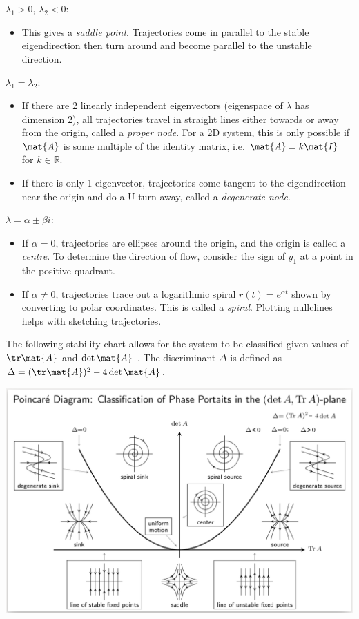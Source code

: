 \documentclass[10pt, a4paper]{article}
\begin{document}
\begin{landscape}
\begin{multicols}{2}
    \(\lambda_1 > 0,\, \lambda_2 < 0\):
    \begin{itemize}
        \item This gives a \emph{saddle point}. Trajectories come in parallel to the
            stable eigendirection then turn around and become parallel to the unstable direction.
    \end{itemize}
    \vfill\columnbreak
    \(\lambda_1 = \lambda_2\):
    \begin{itemize}
        \item If there are 2 linearly independent eigenvectors (eigenspace of \(\lambda\) has dimension 2),
            all trajectories travel in straight lines either towards or away from the origin, called
            a \emph{proper node}. For a 2D system, this is only possible if \(\mat{A}\) is some multiple of
            the identity matrix, i.e. \(\mat{A} = k \mat{I}\) for \(k \in \mathbb{R}\).
        \item If there is only 1 eigenvector, trajectories come tangent to the eigendirection near the origin
            and do a U-turn away, called a \emph{degenerate node}.
    \end{itemize}

    \(\lambda = \alpha \pm \beta i\):
    \begin{itemize}
        \item If \(\alpha = 0\), trajectories are ellipses around the origin, and the origin
            is called a \emph{centre}. To determine the direction of flow, consider the sign of \(\dot y_1\)
            at a point in the positive quadrant.
        \item If \(\alpha \neq 0\), trajectories trace out a logarithmic spiral \(r(t) = e^{\alpha t}\)
            shown by converting to polar coordinates. This is called a \emph{spiral}.
            Plotting nullclines helps with sketching trajectories.
    \end{itemize}

    The following stability chart allows for the system to be classified given values of
    \(\tr \mat{A}\) and \(\det \mat{A}\) \cite{StabilityDiagram}. The discriminant
    \(\Delta\) is defined as \(\Delta = (\tr \mat{A})^2 - 4 \det \mat{A}\).

    {%
        \centering
        \includegraphics[width=\columnwidth]{images/stabilityDiagram.png}
    }%


\end{multicols}
\end{landscape}
\end{document}
